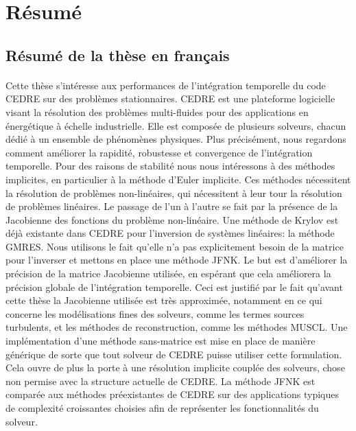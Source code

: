 \section{Résumé}

  \subsection{Résumé de la thèse en français}

    \paragraph{}
Cette thèse s'intéresse aux performances de l'intégration temporelle du code CEDRE sur des problèmes stationnaires.
CEDRE est une plateforme logicielle visant la résolution des problèmes multi-fluides pour des applications en énergétique à échelle industrielle.
Elle est composée de plusieurs solveurs, chacun dédié à un ensemble de phénomènes physiques.
Plus précisément, nous regardons comment améliorer la rapidité, robustesse et convergence de l’intégration temporelle.
Pour des raisons de stabilité nous nous intéressons à des méthodes implicites, en particulier à la méthode d'Euler implicite.
Ces méthodes nécessitent la résolution de problèmes non-linéaires, qui nécessitent à leur tour la résolution de problèmes linéaires.
Le passage de l'un à l'autre se fait par la présence de la Jacobienne des fonctions du problème non-linéaire.
Une méthode de Krylov est déjà existante dans CEDRE pour l'inversion de systèmes linéaires: la méthode GMRES.
Nous utilisons le fait qu'elle n'a pas explicitement besoin de la matrice pour l'inverser et mettons en place une méthode JFNK.
Le but est d'améliorer la précision de la matrice Jacobienne utilisée, en espérant que cela améliorera la précision globale de l'intégration temporelle.
Ceci est justifié par le fait qu'avant cette thèse la Jacobienne utilisée est très approximée, notamment en ce qui concerne les modélisations fines des solveurs, comme les termes sources turbulents, et les méthodes de reconstruction, comme les méthodes MUSCL.
Une implémentation d'une méthode sans-matrice est mise en place de manière générique de sorte que tout solveur de CEDRE puisse utiliser cette formulation.
Cela ouvre de plus la porte à une résolution implicite couplée des solveurs, chose non permise avec la structure actuelle de CEDRE.
La méthode JFNK est comparée aux méthodes préexistantes de CEDRE sur des applications typiques de complexité croissantes choisies afin de représenter les fonctionnalités du solveur.

